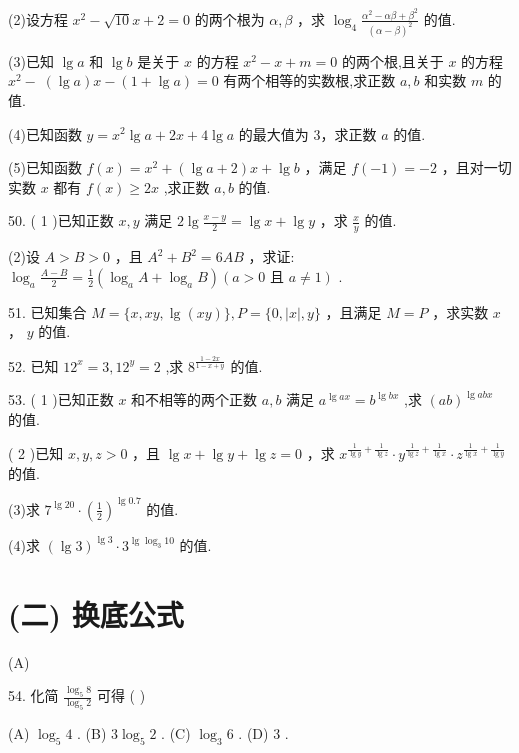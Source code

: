 \documentclass[10pt]{article}
\begin{document}
(2)设方程 \({x}^{2} - \sqrt{10}x + 2 = 0\) 的两个根为 \(\alpha ,\beta\) ，求 \({\log }_{4}\frac{{\alpha }^{2} - {\alpha \beta } + {\beta }^{2}}{{\left( \alpha  - \beta \right) }^{2}}\) 的值.

(3)已知 \(\lg a\) 和 \(\lg b\) 是关于 \(x\) 的方程 \({x}^{2} - x + m = 0\) 的两个根,且关于 \(x\) 的方程 \({x}^{2} - \; \left( {\lg a}\right) x - \left( {1 + \lg a}\right)  = 0\) 有两个相等的实数根,求正数 \(a,b\) 和实数 \(m\) 的值.

(4)已知函数 \(y = {x}^{2}\lg a + {2x} + {4\lg }a\) 的最大值为 3，求正数 \(a\) 的值.

(5)已知函数 \(f\left( x\right)  = {x}^{2} + \left( {\lg a + 2}\right) x + \lg b\) ，满足 \(f\left( {-1}\right)  =  - 2\) ，且对一切实数 \(x\) 都有 \(f\left( x\right)  \geq  {2x}\) ,求正数 \(a,b\) 的值.

50. ( 1 )已知正数 \(x,y\) 满足 \(2\lg \frac{x - y}{2} = \lg x + \lg y\) ，求 \(\frac{x}{y}\) 的值.

(2)设 \(A > B > 0\) ，且 \({A}^{2} + {B}^{2} = {6AB}\) ，求证: \({\log }_{a}\frac{A - B}{2} = \frac{1}{2}\left( {{\log }_{a}A + {\log }_{a}B}\right) \left( {a > 0\text{ 且 }a \neq  1}\right)\) .

51. 已知集合 \(M = \{ x,{xy},\lg \left( {xy}\right) \} ,P = \{ 0,\left| x\right| ,y\}\) ，且满足 \(M = P\) ，求实数 \(x\) ， \(y\) 的值.

52. 已知 \({12}^{x} = 3,{12}^{y} = 2\) ,求 \({8}^{\frac{1 - {2x}}{1 - x + y}}\) 的值.

53. ( 1 )已知正数 \(x\) 和不相等的两个正数 \(a,b\) 满足 \({a}^{\lg {ax}} = {b}^{\lg {bx}}\) ,求 \({\left( ab\right) }^{\lg {abx}}\) 的值.

( 2 )已知 \(x,y,z > 0\) ，且 \(\lg x + \lg y + \lg z = 0\) ，求 \({x}^{\frac{1}{\lg y} + \frac{1}{\lg z}} \cdot  {y}^{\frac{1}{\lg z} + \frac{1}{\lg x}} \cdot  {z}^{\frac{1}{\lg x} + \frac{1}{\lg y}}\) 的值.

(3)求 \({7}^{\lg {20}} \cdot  {\left( \frac{1}{2}\right) }^{\lg {0.7}}\) 的值.

(4)求 \({\left( \lg 3\right) }^{\lg 3} \cdot  {3}^{\lg {\log }_{3}{10}}\) 的值.

\section*{(二) 换底公式}

(A)

54. 化简 \(\frac{{\log }_{5}8}{{\log }_{5}2}\) 可得 ( )

(A) \({\log }_{5}4\) . (B) \(3{\log }_{5}2\) . (C) \({\log }_{3}6\) . (D) 3 .
\end{document}
